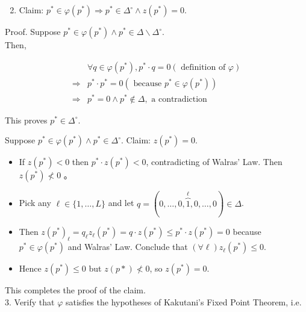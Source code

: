 \documentclass[10pt]{article}
\begin{document}
\begin{enumerate}
  \setcounter{enumi}{1}
  \item Claim: $p^{*} \in \varphi\left(p^{*}\right) \Longrightarrow p^{*} \in \Delta^{\circ} \wedge z\left(p^{*}\right)=0$.
\end{enumerate}

Proof. Suppose $p^{*} \in \varphi\left(p^{*}\right) \wedge p^{*} \in \Delta \backslash \Delta^{\circ}$.\\
Then,

$$
\begin{aligned}
& \forall q \in \varphi\left(p^{*}\right), p^{*} \cdot q=0(\text { definition of } \varphi) \\
\Longrightarrow & p^{*} \cdot p^{*}=0\left(\text { because } p^{*} \in \varphi\left(p^{*}\right)\right) \\
\Longrightarrow & p^{*}=0 \wedge p^{*} \notin \Delta, \text { a contradiction }
\end{aligned}
$$

This proves $p^{*} \in \Delta^{\circ}$.

Suppose $p^{*} \in \varphi\left(p^{*}\right) \wedge p^{*} \in \Delta^{\circ}$. Claim: $z\left(p^{*}\right)=0$.

\begin{itemize}
  \item If $z\left(p^{*}\right)<0$ then $p^{*} \cdot z\left(p^{*}\right)<0$, contradicting of Walras' Law. Then $z\left(p^{*}\right) \nless 0$ 。
  \item Pick any $\ell \in\{1, \ldots, L\}$ and let $q=(0, \ldots, 0, \overbrace{1}^{\ell}, 0, \ldots, 0) \in \Delta$.
  \item Then $z\left(p^{*}\right)_{\ell}=q_{\ell} z_{\ell}\left(p^{*}\right)=q \cdot z\left(p^{*}\right) \leq p^{*} \cdot z\left(p^{*}\right)=0$ because $p^{*} \in \varphi\left(p^{*}\right)$ and Walras' Law. Conclude that $(\forall \ell) z_{\ell}\left(p^{*}\right) \leq 0$.
  \item Hence $z\left(p^{*}\right) \leq 0$ but $z(p *) \nless 0$, so $z\left(p^{*}\right)=0$.
\end{itemize}

This completes the proof of the claim.\\
3. Verify that $\varphi$ satisfies the hypotheses of Kakutani's Fixed Point Theorem, i.e.
\end{document}
